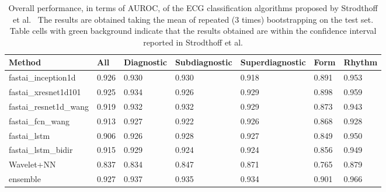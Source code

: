 \begin{table}[h]
\scriptsize
\caption{Overall performance, in terms of AUROC, of the ECG classification algorithms proposed by Strodthoff et al.~\cite{strodthoff_deep_2020} The results are obtained taking the mean of repeated (3 times) bootstrapping on the test set. Table cells with green background indicate that the results obtained are within the confidence interval reported in Strodthoff et al.}
\begin{tabular}{lllllll}
\cellcolor[HTML]{C0C0C0}\textbf{Method} & \cellcolor[HTML]{C0C0C0}\textbf{All} & \cellcolor[HTML]{C0C0C0}\textbf{Diagnostic} & \cellcolor[HTML]{C0C0C0}\textbf{Subdiagnostic} & \cellcolor[HTML]{C0C0C0}\textbf{Superdiagnostic} & \cellcolor[HTML]{C0C0C0}\textbf{Form} & \cellcolor[HTML]{C0C0C0}\textbf{Rhythm} \\\hline
fastai\_inception1d    & \cellcolor{green!25} 0.926 & \cellcolor{green!25} 0.930 & \cellcolor{green!25} 0.930 & \cellcolor{green!25} 0.918 & \cellcolor{green!25} 0.891 & \cellcolor{green!25} 0.953 \\
fastai\_xresnet1d101   & \cellcolor{green!25} 0.925 & \cellcolor{green!25} 0.934 & \cellcolor{green!25} 0.926 & \cellcolor{green!25} 0.929 & \cellcolor{green!25} 0.898 & \cellcolor{green!25} 0.959 \\
fastai\_resnet1d\_wang & \cellcolor{green!25} 0.919 & \cellcolor{green!25} 0.932 & \cellcolor{green!25} 0.932 & \cellcolor{green!25} 0.929 & \cellcolor{green!25} 0.873 & \cellcolor{green!25} 0.943 \\
fastai\_fcn\_wang      & \cellcolor{green!25} 0.913 & \cellcolor{green!25} 0.927 & \cellcolor{green!25} 0.922 & \cellcolor{green!25} 0.926 & \cellcolor{green!25} 0.868 & \cellcolor{green!25} 0.928 \\
fastai\_lstm           & \cellcolor{green!25} 0.906 & \cellcolor{green!25} 0.926 & \cellcolor{green!25} 0.928 & \cellcolor{green!25} 0.927 & \cellcolor{green!25} 0.849 & \cellcolor{green!25} 0.950 \\
fastai\_lstm\_bidir    & \cellcolor{green!25} 0.915 & \cellcolor{green!25} 0.929 & \cellcolor{green!25} 0.924 & \cellcolor{green!25} 0.924 & \cellcolor{red!25} 0.856   & \cellcolor{green!25} 0.949 \\
Wavelet+NN             & \cellcolor{green!25} 0.837 & \cellcolor{red!25} 0.834   & \cellcolor{green!25} 0.847 & \cellcolor{green!25} 0.871 & \cellcolor{green!25} 0.765 & \cellcolor{green!25} 0.879 \\
ensemble               & \cellcolor{green!25} 0.927 & \cellcolor{green!25} 0.937 & \cellcolor{green!25} 0.935 & \cellcolor{green!25} 0.934 & \cellcolor{green!25} 0.901 & \cellcolor{green!25} 0.966 \\\hline                            
\end{tabular}
\label{tab:rep_main}
\end{table}



